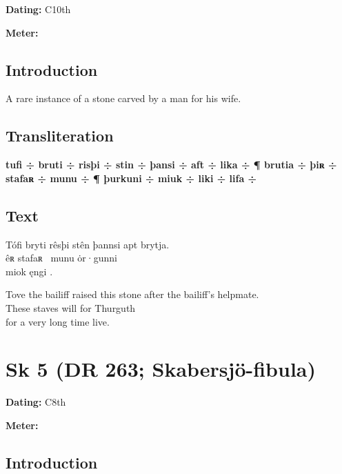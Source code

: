 \begin{flushright}%
\textbf{Dating:} C10th

\textbf{Meter:} \Ljodahattr
\end{flushright}%

\subsection{Introduction}

A rare instance of a stone carved by a man for his wife.

\subsection{Transliteration}

\textbf{tufi ÷ bruti ÷ risþi ÷ stin ÷ þansi ÷ aft ÷ lika ÷ ¶ brutia ÷ þiʀ ÷ stafaʀ ÷ munu ÷ ¶ þurkuni ÷ miuk ÷ liki ÷ lifa ÷}

\subsection{Text}

\bpg\bpa[0]%
\startsub Tófi bryti rêsþi stên þannsi apt  brytja.\endsub \\
êʀ stafaʀ \hld\ munu ȯr·gunni \\
\ind miok ęngi .\epa

\bpb Tove the bailiff raised this stone after the bailiff’s helpmate. \\
These staves will for Thurguth \\
\ind for a very long time live.\epb\epg

\sectionline\newpage


\section{Sk 5 (DR 263; Skabersjö-fibula)}

\begin{flushright}%
\textbf{Dating:} C8th

\textbf{Meter:} \Fornyrdislag
\end{flushright}%

\subsection{Introduction}


